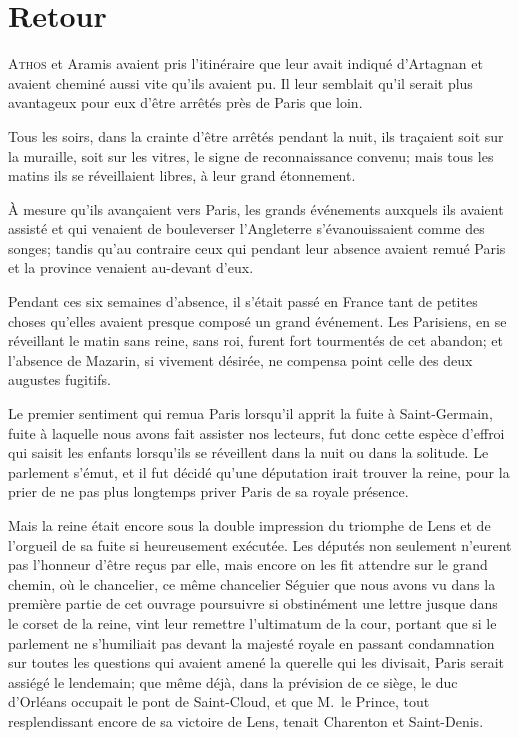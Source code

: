\chapter{Retour}

\lettrine{A}{thos} et Aramis avaient pris l'itinéraire que leur avait indiqué d'Artagnan et avaient cheminé aussi vite qu'ils avaient pu. Il leur semblait qu'il serait plus avantageux pour eux d'être arrêtés près de Paris que loin.

\zz
Tous les soirs, dans la crainte d'être arrêtés pendant la nuit, ils traçaient soit sur la muraille, soit sur les vitres, le signe de reconnaissance convenu; mais tous les matins ils se réveillaient libres, à leur grand étonnement.

À mesure qu'ils avançaient vers Paris, les grands événements auxquels ils avaient assisté et qui venaient de bouleverser l'Angleterre s'évanouissaient comme des songes; tandis qu'au contraire ceux qui pendant leur absence avaient remué Paris et la province venaient au-devant d'eux.

Pendant ces six semaines d'absence, il s'était passé en France tant de petites choses qu'elles avaient presque composé un grand événement. Les Parisiens, en se réveillant le matin sans reine, sans roi, furent fort tourmentés de cet abandon; et l'absence de Mazarin, si vivement désirée, ne compensa point celle des deux augustes fugitifs.

Le premier sentiment qui remua Paris lorsqu'il apprit la fuite à Saint-Germain, fuite à laquelle nous avons fait assister nos lecteurs, fut donc cette espèce d'effroi qui saisit les enfants lorsqu'ils se réveillent dans la nuit ou dans la solitude. Le parlement s'émut, et il fut décidé qu'une députation irait trouver la reine, pour la prier de ne pas plus longtemps priver Paris de sa royale présence.

Mais la reine était encore sous la double impression du triomphe de Lens et de l'orgueil de sa fuite si heureusement exécutée. Les députés non seulement n'eurent pas l'honneur d'être reçus par elle, mais encore on les fit attendre sur le grand chemin, où le chancelier, ce même chancelier Séguier que nous avons vu dans la première partie de cet ouvrage poursuivre si obstinément une lettre jusque dans le corset de la reine, vint leur remettre l'ultimatum de la cour, portant que si le parlement ne s'humiliait pas devant la majesté royale en passant condamnation sur toutes les questions qui avaient amené la querelle qui les divisait, Paris serait assiégé le lendemain; que même déjà, dans la prévision de ce siège, le duc d'Orléans occupait le pont de Saint-Cloud, et que M.~le Prince, tout resplendissant encore de sa victoire de Lens, tenait Charenton et Saint-Denis.


